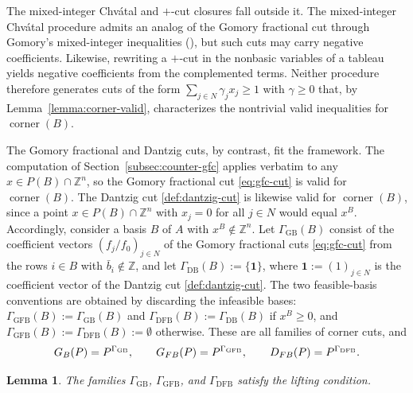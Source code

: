 \documentclass{article}
\newtheorem{lemma}{Lemma}
\newcommand{\Z}{\mathbb{Z}}
\begin{document}
The mixed-integer Chv\'atal and $+$-cut closures fall outside it. The mixed-integer Chv\'atal procedure admits an analog of the Gomory fractional cut through Gomory's mixed-integer inequalities (\cite{gomory1960mixed}), but such cuts may carry negative coefficients. Likewise, rewriting a $+$-cut in the nonbasic variables of a tableau yields negative coefficients from the complemented terms. Neither procedure therefore generates cuts of the form $\sum_{j \in N} \gamma_j x_j \geq 1$ with $\gamma \geq 0$ that, by Lemma~\ref{lemma:corner-valid}, characterizes the nontrivial valid inequalities for $\operatorname{corner}(B)$.

The Gomory fractional and Dantzig cuts, by contrast, fit the framework. The computation of Section~\ref{subsec:counter-gfc} applies verbatim to any $x \in P(B) \cap \Z^n$, so the Gomory fractional cut \eqref{eq:gfc-cut} is valid for $\operatorname{corner}(B)$. The Dantzig cut \eqref{def:dantzig-cut} is likewise valid for $\operatorname{corner}(B)$, since a point $x \in P(B) \cap \Z^n$ with $x_j = 0$ for all $j \in N$ would equal $x^B$. Accordingly, consider a basis $B$ of $A$ with $x^B \notin \Z^n$. Let $\Gamma_{\mathrm{GB}}(B)$ consist of the coefficient vectors $(f_j/f_0)_{j \in N}$ of the Gomory fractional cuts \eqref{eq:gfc-cut} from the rows $i \in B$ with $\bar b_i \notin \Z$, and let $\Gamma_{\mathrm{DB}}(B) := \{\mathbf{1}\}$, where $\mathbf{1} := (1)_{j \in N}$ is the coefficient vector of the Dantzig cut \eqref{def:dantzig-cut}. The two feasible-basis conventions are obtained by discarding the infeasible bases: $\Gamma_{\mathrm{GFB}}(B) := \Gamma_{\mathrm{GB}}(B)$ and $\Gamma_{\mathrm{DFB}}(B) := \Gamma_{\mathrm{DB}}(B)$ if $x^B \geq 0$, and $\Gamma_{\mathrm{GFB}}(B) := \Gamma_{\mathrm{DFB}}(B) := \emptyset$ otherwise. These are all families of corner cuts, and
\begin{align}
    G_{B}(P) = P^{\Gamma_{\mathrm{GB}}}, \qquad G_{FB}(P) = P^{\Gamma_{\mathrm{GFB}}}, \qquad D_{FB}(P) = P^{\Gamma_{\mathrm{DFB}}}. \notag
\end{align}

\begin{lemma} \label{lemma:lifting-taxonomy}
    The families $\Gamma_{\mathrm{GB}}$, $\Gamma_{\mathrm{GFB}}$, and $\Gamma_{\mathrm{DFB}}$ satisfy the lifting condition.
\end{lemma}
\end{document}

